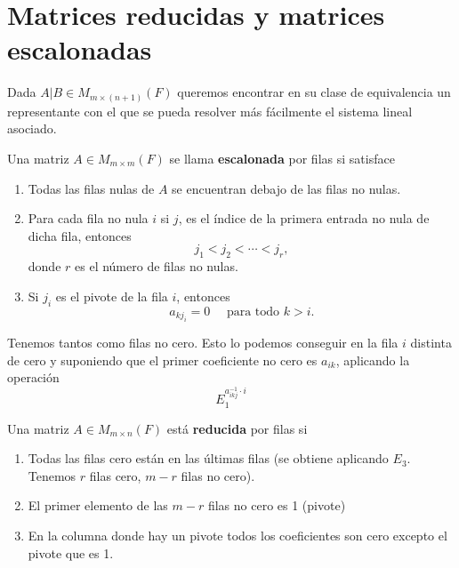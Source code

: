 \documentclass[12pt,a4paper]{book}
\begin{document}
    \section{Matrices reducidas y matrices escalonadas}

    Dada $A|B\in M_{m\times(n+1)}(F)$ queremos encontrar en su clase de equivalencia un representante con el que
    se pueda resolver más fácilmente el sistema lineal asociado.

    \begin{definicion}
    \label{def:7}
        Una matriz $A\in M_{m\times m}(F)$ se llama \textbf{escalonada} por filas si satisface
        \begin{enumerate}
            \item Todas las filas nulas de $A$ se encuentran debajo de las filas no nulas.
            \item Para cada fila no nula $i$ si $j$, es el índice de la primera entrada no nula de dicha fila,
            entonces
            \begin{equation*}
                j_{1}\lt j_{2}\lt\cdots\lt j_{r},
            \end{equation*}
            donde $r$ es el número de filas no nulas.
            \item Si $j_{i}$ es el pivote de la fila $i$, entonces
            \begin{equation*}
                a_{kj_{i}}=0\quad\text{ para todo }k\gt i.
            \end{equation*}
        \end{enumerate}
    \end{definicion}

    Tenemos tantos como filas no cero. Esto lo podemos conseguir en la fila $i$ distinta de cero y suponiendo que
    el primer coeficiente no cero es $a_{ik}$, aplicando la operación
    \begin{equation*}
        E_{1}^{a_{ikj}^{-1}\cdot i}
    \end{equation*}

    \begin{definicion}
    \label{def:8}
        Una matriz $A\in M_{m\times n}(F)$ está \textbf{reducida} por filas si
        \begin{enumerate}
            \item Todas las filas cero están en las últimas filas (se obtiene aplicando $E_{3}$.
            Tenemos $r$ filas cero, $m-r$ filas no cero).
            \item El primer elemento de las $m-r$ filas no cero es 1 (pivote)
            \item En la columna donde hay un pivote todos los coeficientes son cero excepto el pivote que es 1.
        \end{enumerate}
    \end{definicion}
\end{document}
